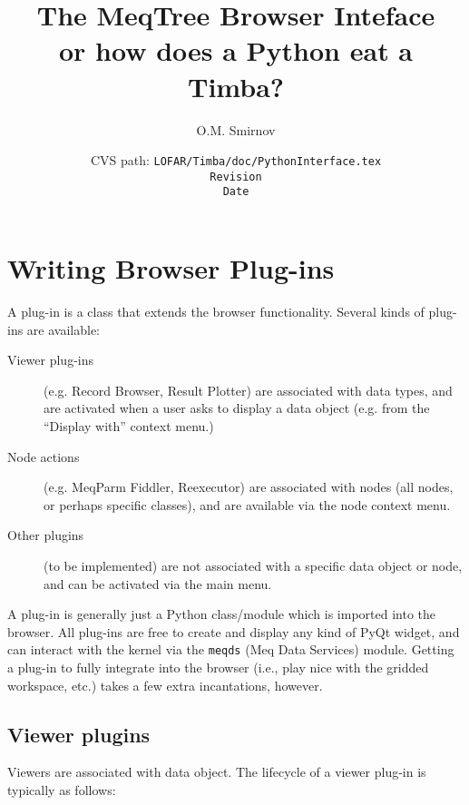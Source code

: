 \documentclass[12pt,twoside]{book}
\title{{\sf The MeqTree Browser Inteface\\\small or how does a Python eat a
Timba?}}
\author{{\sf O.M. Smirnov}}
\date{\vspace{2cm}\small CVS path: \tt LOFAR/Timba/doc/PythonInterface.tex\\\rm
$ $Revision$ $\\$ $Date$ $}
\begin{document}
\sloppy

\maketitle


\chapter{Writing Browser Plug-ins}

  A plug-in is a class that extends the browser functionality. Several kinds of
  plug-ins are available:
  
  \begin{description}
  
  \item[Viewer plug-ins] (e.g. Record Browser, Result Plotter) are associated
  with data types, and are activated when a user asks to display a data object
  (e.g. from the ``Display with'' context menu.)

  \item[Node actions] (e.g. MeqParm Fiddler, Reexecutor) are associated with
  nodes (all nodes, or perhaps specific classes), and are available via the node
  context menu.

  \item[Other plugins] (to be implemented) are not associated with a specific
  data object or node, and can be activated via the main menu.

  \end{description}
  
  A plug-in is generally just a Python class/module which is imported into the
  browser. All plug-ins are free to create and display any kind of PyQt widget,
  and can interact with the kernel via the {\tt meqds} (Meq Data Services)
  module. Getting a plug-in to fully integrate into the browser (i.e., 
  play nice with the gridded workspace, etc.) takes a few extra incantations,
  however.
  
\section{Viewer plugins}

  Viewers are associated with data object. The lifecycle of a viewer plug-in is
  typically as follows:
  
\end{document}
